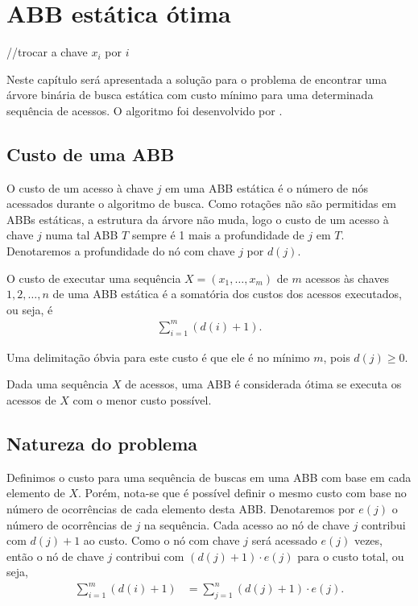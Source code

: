 
\chapter{ABB estática ótima}
\label{cap:abb-estatica-otima}

//trocar a chave $x_i$ por $i$

Neste capítulo será apresentada a solução para o problema de encontrar uma árvore binária de busca estática com custo mínimo para uma determinada sequência de acessos. O algoritmo foi desenvolvido por \cite{knuth}.

\section{Custo de uma ABB}

O custo de um acesso à chave $j$ em uma ABB estática é o número de nós acessados durante o algoritmo de busca. Como rotações não são permitidas em ABBs estáticas, a estrutura da árvore não muda, logo o custo de um acesso à chave $j$ numa tal ABB $T$ sempre é 1 mais a profundidade de $j$ em $T$. Denotaremos a profundidade do nó com chave $j$ por $d(j)$.

O custo de executar uma sequência $X = (x_{1},\ldots,x_{m})$ de $m$ acessos às chaves $1, 2,\ldots,n$ de uma ABB estática é a somatória dos custos dos acessos executados, ou seja, é
\begin{align*}
    \sum_{i=1}^{m} (d(i) + 1).
\end{align*}

Uma delimitação óbvia para este custo é que ele é no mínimo $m$, pois $d(j) \geq 0$.

Dada uma sequência $X$ de acessos, uma ABB é considerada ótima se executa os acessos de $X$ com o menor custo possível.

\section{Natureza do problema}

Definimos o custo para uma sequência de buscas em uma ABB com base em cada elemento de $X$. Porém, nota-se que é possível definir o mesmo custo com base no número de ocorrências de cada elemento desta ABB. Denotaremos por $e(j)$ o número de ocorrências de $j$ na sequência.
Cada acesso ao nó de chave $j$ contribui com $d(j) + 1$ ao custo. Como o nó com chave $j$ será acessado $e(j)$ vezes, então o nó de chave $j$ contribui com $(d(j) + 1)  \cdot e(j)$ para o custo total, ou seja,
\begin{align*}
\sum_{i=1}^{m} (d(i) + 1) &= \sum_{j=1}^{n} (d(j) + 1) \cdot e(j).
\end{align*}


